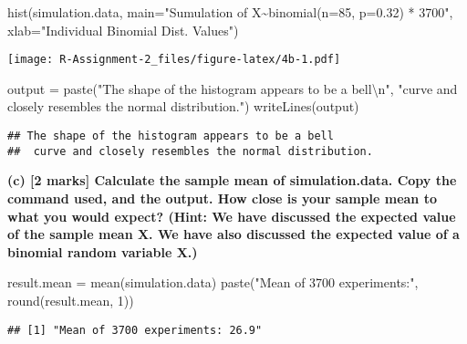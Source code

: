 \documentclass[
]{article}
\newenvironment{Shaded}{\begin{snugshade}}{\end{snugshade}}
\newcommand{\AttributeTok}[1]{\textcolor[rgb]{0.77,0.63,0.00}{#1}}
\newcommand{\DecValTok}[1]{\textcolor[rgb]{0.00,0.00,0.81}{#1}}
\newcommand{\FunctionTok}[1]{\textcolor[rgb]{0.00,0.00,0.00}{#1}}
\newcommand{\NormalTok}[1]{#1}
\newcommand{\OtherTok}[1]{\textcolor[rgb]{0.56,0.35,0.01}{#1}}
\newcommand{\SpecialCharTok}[1]{\textcolor[rgb]{0.00,0.00,0.00}{#1}}
\newcommand{\StringTok}[1]{\textcolor[rgb]{0.31,0.60,0.02}{#1}}
\begin{document}
\begin{Shaded}
\begin{Highlighting}[]
\FunctionTok{hist}\NormalTok{(simulation.data,}
     \AttributeTok{main=}\StringTok{"Sumulation of X\textasciitilde{}binomial(n=85, p=0.32) * 3700"}\NormalTok{,}
     \AttributeTok{xlab=}\StringTok{"Individual Binomial Dist. Values"}\NormalTok{)}
\end{Highlighting}
\end{Shaded}

\texttt{[image: R-Assignment-2\_files/figure-latex/4b-1.pdf]}

\begin{Shaded}
\begin{Highlighting}[]
\NormalTok{output }\OtherTok{=} \FunctionTok{paste}\NormalTok{(}\StringTok{"The shape of the histogram appears to be a bell}\SpecialCharTok{\textbackslash{}n}\StringTok{"}\NormalTok{, }
               \StringTok{"curve and closely resembles the normal distribution."}\NormalTok{)}
\FunctionTok{writeLines}\NormalTok{(output)}
\end{Highlighting}
\end{Shaded}

\begin{verbatim}
## The shape of the histogram appears to be a bell
##  curve and closely resembles the normal distribution.
\end{verbatim}

\newline
\newline

\textbf{(c) {[}2 marks{]} Calculate the sample mean of simulation.data.
Copy the command used, and the output. How close is your sample mean to
what you would expect? (Hint: We have discussed the expected value of
the sample mean X. We have also discussed the expected value of a
binomial random variable X.)}

\begin{Shaded}
\begin{Highlighting}[]
\NormalTok{result.mean }\OtherTok{=} \FunctionTok{mean}\NormalTok{(simulation.data)}
\FunctionTok{paste}\NormalTok{(}\StringTok{"Mean of 3700 experiments:"}\NormalTok{, }\FunctionTok{round}\NormalTok{(result.mean, }\DecValTok{1}\NormalTok{))}
\end{Highlighting}
\end{Shaded}

\begin{verbatim}
## [1] "Mean of 3700 experiments: 26.9"
\end{verbatim}
\end{document}
